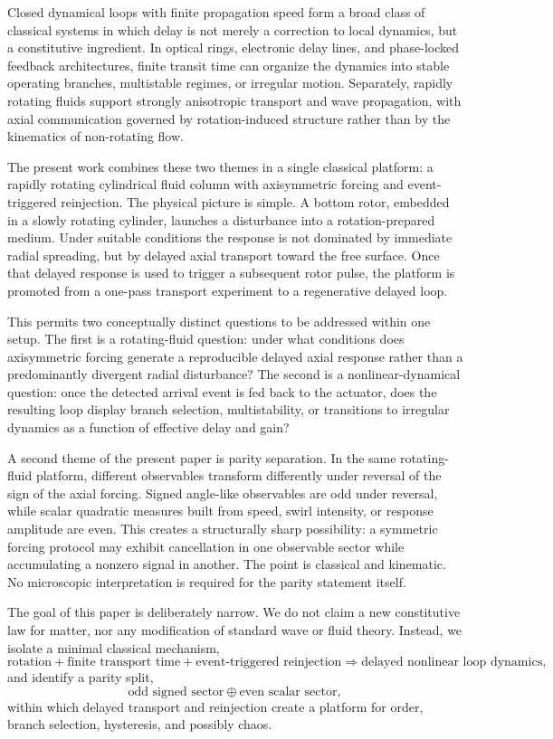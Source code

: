 \documentclass[11pt,a4paper]{article}
\begin{document}
Closed dynamical loops with finite propagation speed form a broad class of classical systems in which delay is not merely a correction to local dynamics, but a constitutive ingredient. In optical rings, electronic delay lines, and phase-locked feedback architectures, finite transit time can organize the dynamics into stable operating branches, multistable regimes, or irregular motion. Separately, rapidly rotating fluids support strongly anisotropic transport and wave propagation, with axial communication governed by rotation-induced structure rather than by the kinematics of non-rotating flow.

The present work combines these two themes in a single classical platform: a rapidly rotating cylindrical fluid column with axisymmetric forcing and event-triggered reinjection. The physical picture is simple. A bottom rotor, embedded in a slowly rotating cylinder, launches a disturbance into a rotation-prepared medium. Under suitable conditions the response is not dominated by immediate radial spreading, but by delayed axial transport toward the free surface. Once that delayed response is used to trigger a subsequent rotor pulse, the platform is promoted from a one-pass transport experiment to a regenerative delayed loop.

This permits two conceptually distinct questions to be addressed within one setup. The first is a rotating-fluid question: under what conditions does axisymmetric forcing generate a reproducible delayed axial response rather than a predominantly divergent radial disturbance? The second is a nonlinear-dynamical question: once the detected arrival event is fed back to the actuator, does the resulting loop display branch selection, multistability, or transitions to irregular dynamics as a function of effective delay and gain?

A second theme of the present paper is parity separation. In the same rotating-fluid platform, different observables transform differently under reversal of the sign of the axial forcing. Signed angle-like observables are odd under reversal, while scalar quadratic measures built from speed, swirl intensity, or response amplitude are even. This creates a structurally sharp possibility: a symmetric forcing protocol may exhibit cancellation in one observable sector while accumulating a nonzero signal in another. The point is classical and kinematic. No microscopic interpretation is required for the parity statement itself.

The goal of this paper is deliberately narrow. We do not claim a new constitutive law for matter, nor any modification of standard wave or fluid theory. Instead, we isolate a minimal classical mechanism,
\begin{equation}
\text{rotation} + \text{finite transport time} + \text{event-triggered reinjection}
\Longrightarrow
\text{delayed nonlinear loop dynamics},
\end{equation}
and identify a parity split,
\begin{equation}
\text{odd signed sector} \oplus \text{even scalar sector},
\end{equation}
within which delayed transport and reinjection create a platform for order, branch selection, hysteresis, and possibly chaos.
\end{document}
